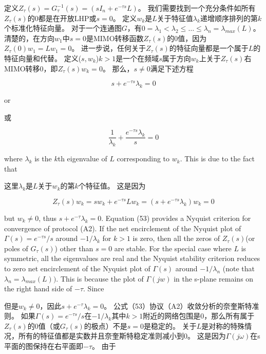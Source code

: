 \documentclass{article}
\begin{document}
\noindent 定义$Z_{\tau}(s) = G_{\tau}^{-1}(s) = (sI_n + e^{-\tau s}L)$。
我们需要找到一个充分条件如所有$Z_{\tau}(s)$的0都是在开放LHP或$s=0$。
定义$w_k$是$L$关于特征值$\lambda_k$递增顺序排列的第$k$个标准化特征向量。
对于一个连通图$G$，有$0=\lambda_1 < \lambda_2 \le \dots \le  \lambda_n =\lambda_{max}(L)$。
清楚的，在方向$w_1$中$s=0$是MIMO转移函数$Z_{\tau}(s)$的0值，因为$Z_{\tau}(0)w_1 = Lw_1 = 0$。
进一步说，任何关于$Z_{\tau}(s)$的特征向量都是一个属于$L$的特征向量和代替。
定义($s,w_k$)$k>1$是一个在频域$s$属于方向$w_k$上关于$Z_{\tau}(s)$右MIMO转移0，即$Z_{\tau}(s)w_k=0$。
那么，$s\ne0$满足下述方程

\begin{equation}
    \tag{52}
    \label{52}
    s+e^{-\tau s}\lambda_k = 0
\end{equation}

{\color[gray]{0.5}
\noindent or
}

\noindent 或


\begin{equation}
    \tag{53}
    \label{53}
    \frac{1}{\lambda_k} + \frac{e^{-\tau s}\lambda_k}{s} = 0
\end{equation}

{\color[gray]{0.5}
\noindent where $\lambda_k$ is the $k$th eigenvalue of $L$ corresponding to $w_k$. 
This is due to the fact that
}

\noindent 这里$\lambda_k$是$L$关于$w_k$的第$k$个特征值。
这是因为

\begin{equation}
    \tag{54}
    \label{54}
    Z_{\tau}(s) w_k = sw_k + e^{-\tau s}Lw_k = (s+e^{-\tau s}\lambda_k)w_k = 0
\end{equation}

{\color[gray]{0.5}
\noindent but $w_k\ne 0$, thus $s+e^{-\tau}\lambda_k=0$. 
Equation (53) provides a Nyquist criterion for convergence of protocol (A2). 
If the net encirclement of the Nyquist plot of $\Gamma(s) = e^{-\tau s}/s$ around $-1/\lambda_k$ for $k>1$ is zero, then all the zeros of $Z_\tau(s)$(or poles of $G_{\tau}(s)$) other than $s=0$ are stable.
For the special case where $L$ is symmetric, all the eigenvalues are real and {\color{green}the Nyquist stability criterion reduces to zero net encirclement of the Nyquist plot of $\Gamma(s)$ around $-1/\lambda_n$ (note that $\lambda_n=\lambda_{max}(L))$.} 
This is because the plot of $\Gamma(jw)$ in the s-plane remains on the right hand side of $-\tau$. 
Since
}

\noindent 但是$w_k\ne 0$，因此$s+e^{-\tau}\lambda_k=0$。
公式（53）协议（A2）收敛分析的奈奎斯特准则。
如果$\Gamma(s) = e^{-\tau s}/s$在$-1/\lambda_k$其中$k>1$附近的网络包围是0，那么所有属于$Z_\tau(s)$的0值（或$G_{\tau}(s)$的极点）不是$s=0$是稳定的。
关于$L$是对称的特殊情况，所有的特征值都是实数并且奈奎斯特稳定准则减小到0。
这是因为$\Gamma(j\omega)$在s平面的图保持在右平面即$-\tau$。
由于
\end{document}
